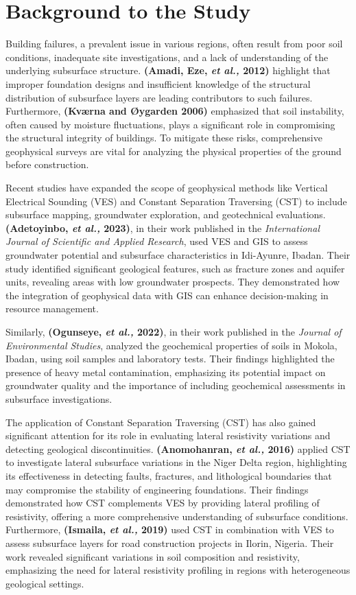 \documentclass[12pt,a4paper]{report}
\begin{document}
\section{Background to the Study}

Building failures, a prevalent issue in various regions, often result from poor soil conditions, inadequate site investigations, and a lack of understanding of the underlying subsurface structure. \textbf{(Amadi, Eze, \textit{et al.,} 2012)} highlight that improper foundation designs and insufficient knowledge of the structural distribution of subsurface layers are leading contributors to such failures. Furthermore, \textbf{(Kværna and \textbf{Øygarden} 2006)} emphasized that soil instability, often caused by moisture fluctuations, plays a significant role in compromising the structural integrity of buildings. To mitigate these risks, comprehensive geophysical surveys are vital for analyzing the physical properties of the ground before construction.

Recent studies have expanded the scope of geophysical methods like Vertical Electrical Sounding (VES) and Constant Separation Traversing (CST) to include subsurface mapping, groundwater exploration, and geotechnical evaluations. \textbf{(Adetoyinbo, \textit{et al.,} 2023)}, in their work published in the \textit{International Journal of Scientific and Applied Research}, used VES and GIS to assess groundwater potential and subsurface characteristics in Idi-Ayunre, Ibadan. Their study identified significant geological features, such as fracture zones and aquifer units, revealing areas with low groundwater prospects. They demonstrated how the integration of geophysical data with GIS can enhance decision-making in resource management.

Similarly, \textbf{(Ogunseye, \textit{et al.,} 2022)}, in their work published in the \textit{Journal of Environmental Studies}, analyzed the geochemical properties of soils in Mokola, Ibadan, using soil samples and laboratory tests. Their findings highlighted the presence of heavy metal contamination, emphasizing its potential impact on groundwater quality and the importance of including geochemical assessments in subsurface investigations.

The application of Constant Separation Traversing (CST) has also gained significant attention for its role in evaluating lateral resistivity variations and detecting geological discontinuities. \textbf{(Anomohanran, \textit{et al.,} 2016)} applied CST to investigate lateral subsurface variations in the Niger Delta region, highlighting its effectiveness in detecting faults, fractures, and lithological boundaries that may compromise the stability of engineering foundations. Their findings demonstrated how CST complements VES by providing lateral profiling of resistivity, offering a more comprehensive understanding of subsurface conditions. Furthermore, \textbf{(Ismaila, \textit{et al.,} 2019)} used CST in combination with VES to assess subsurface layers for road construction projects in Ilorin, Nigeria. Their work revealed significant variations in soil composition and resistivity, emphasizing the need for lateral resistivity profiling in regions with heterogeneous geological settings.
\end{document}
